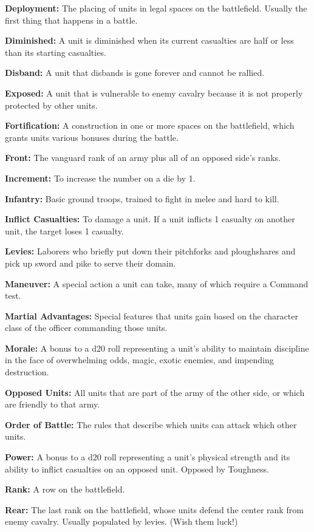 \documentclass[10pt,a4paper,twoside,bg=print,twocolumn,openany,nodeprecatedcode]{dndbook}
\begin{document}
\textbf{Deployment:} The placing of units in legal spaces on the battlefield. Usually the first thing that happens in a battle.

\textbf{Diminished:} A unit is diminished when its current casualties are half or less than its starting casualties.

\textbf{Disband:} A unit that disbands is gone forever and cannot be rallied.

\textbf{Exposed:} A unit that is vulnerable to enemy cavalry because it is not properly protected by other units.

\textbf{Fortification:} A construction in one or more spaces on the battlefield, which grants units various bonuses during the battle.

\textbf{Front:} The vanguard rank of an army plus all of an opposed side's ranks.

\textbf{Increment:} To increase the number on a die by 1.

\textbf{Infantry:} Basic ground troops, trained to fight in melee and hard to kill.

\textbf{Inflict Casualties:} To damage a unit. If a unit inflicts 1 casualty on another unit, the target loses 1 casualty.

\textbf{Levies:} Laborers who briefly put down their pitchforks and ploughshares and pick up sword and pike to serve their domain.

\textbf{Maneuver:} A special action a unit can take, many of which require a Command test.

\textbf{Martial Advantages:} Special features that units gain based on the character class of the officer commanding those units.

\textbf{Morale:} A bonus to a d20 roll representing a unit's ability to maintain discipline in the face of overwhelming odds, magic, exotic enemies, and impending destruction.

\textbf{Opposed Units:} All units that are part of the army of the other side, or which are friendly to that army.

\textbf{Order of Battle:} The rules that describe which units can attack which other units.

\textbf{Power:} A bonus to a d20 roll representing a unit's physical strength and its ability to inflict casualties on an opposed unit. Opposed by Toughness.

\textbf{Rank:} A row on the battlefield.

\textbf{Rear:} The last rank on the battlefield, whose units defend the center rank from enemy cavalry. Usually populated by levies. (Wish them luck!)
\end{document}
